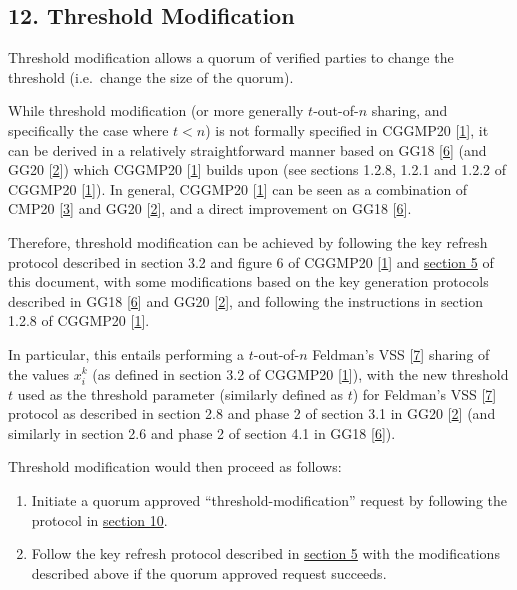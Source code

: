 \documentclass[
]{article}
\providecommand{\tightlist}{%
  \setlength{\itemsep}{0pt}\setlength{\parskip}{0pt}}
\begin{document}
\hypertarget{threshold-modification}{%
\subsection{12. Threshold Modification}\label{threshold-modification}}

Threshold modification allows a quorum of verified parties to change the
threshold (i.e.~change the size of the quorum).

While threshold modification (or more generally \(t\)-out-of-\(n\)
sharing, and specifically the case where \(t < n\)) is not formally
specified in CGGMP20 {[}\protect\hyperlink{ref-cggmp20}{1}{]}, it can be
derived in a relatively straightforward manner based on GG18
{[}\protect\hyperlink{ref-gg18}{6}{]} (and GG20
{[}\protect\hyperlink{ref-gg20}{2}{]}) which CGGMP20
{[}\protect\hyperlink{ref-cggmp20}{1}{]} builds upon (see sections
1.2.8, 1.2.1 and 1.2.2 of CGGMP20
{[}\protect\hyperlink{ref-cggmp20}{1}{]}). In general, CGGMP20
{[}\protect\hyperlink{ref-cggmp20}{1}{]} can be seen as a combination of
CMP20 {[}\protect\hyperlink{ref-cmp20}{3}{]} and GG20
{[}\protect\hyperlink{ref-gg20}{2}{]}, and a direct improvement on GG18
{[}\protect\hyperlink{ref-gg18}{6}{]}.

Therefore, threshold modification can be achieved by following the key
refresh protocol described in section 3.2 and figure 6 of CGGMP20
{[}\protect\hyperlink{ref-cggmp20}{1}{]} and
\protect\hyperlink{key-refresh}{section 5} of this document, with some
modifications based on the key generation protocols described in GG18
{[}\protect\hyperlink{ref-gg18}{6}{]} and GG20
{[}\protect\hyperlink{ref-gg20}{2}{]}, and following the instructions in
section 1.2.8 of CGGMP20 {[}\protect\hyperlink{ref-cggmp20}{1}{]}.

In particular, this entails performing a \(t\)-out-of-\(n\) Feldman's
VSS {[}\protect\hyperlink{ref-feldman-vss}{7}{]} sharing of the values
\(x_i^k\) (as defined in section 3.2 of CGGMP20
{[}\protect\hyperlink{ref-cggmp20}{1}{]}), with the new threshold \(t\)
used as the threshold parameter (similarly defined as \(t\)) for
Feldman's VSS {[}\protect\hyperlink{ref-feldman-vss}{7}{]} protocol as
described in section 2.8 and phase 2 of section 3.1 in GG20
{[}\protect\hyperlink{ref-gg20}{2}{]} (and similarly in section 2.6 and
phase 2 of section 4.1 in GG18 {[}\protect\hyperlink{ref-gg18}{6}{]}).

Threshold modification would then proceed as follows:

\begin{enumerate}
\def\labelenumi{\arabic{enumi}.}
\tightlist
\item
  Initiate a quorum approved ``threshold-modification'' request by
  following the protocol in
  \protect\hyperlink{quorum-approved-request}{section 10}.
\item
  Follow the key refresh protocol described in
  \protect\hyperlink{key-refresh}{section 5} with the modifications
  described above if the quorum approved request succeeds.
\end{enumerate}
\end{document}
